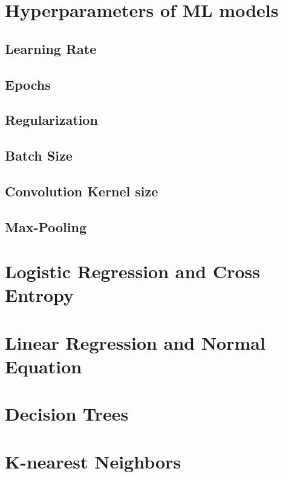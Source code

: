 \section{Hyperparameters of ML models}

\subsection{Learning Rate}
\subsection{Epochs}
\subsection{Regularization}
\subsection{Batch Size}
\subsection{Convolution Kernel size}
\subsection{Max-Pooling}

\section{Logistic Regression and Cross Entropy}


\section{Linear Regression and Normal Equation}


\section{Decision Trees}


\section{K-nearest Neighbors}

